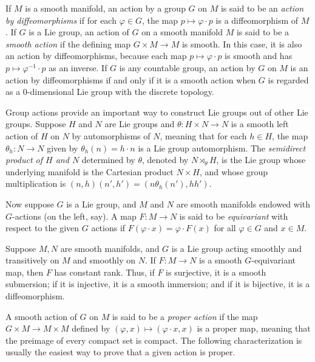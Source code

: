If $M$ is a smooth manifold, an action by a group $G$ on $M$ is said to be an \textit{action by diffeomorphisms} if for each $\varphi \in G$, the map $p \mapsto \varphi \cdot p$ is a diffeomorphism of $M$. If $G$ is a Lie group, an action of $G$ on a smooth manifold $M$ is said to be a \textit{smooth action} if the defining map $G \times M \to M$ is smooth. In this case, it is also an action by diffeomorphisms, because each map $p \mapsto \varphi \cdot p$ is smooth and has $p \mapsto \varphi^{-1} \cdot p$ as an inverse. If $G$ is any countable group, an action by $G$ on $M$ is an action by diffeomorphisms if and only if it is a smooth action when $G$ is regarded as a $0$-dimensional Lie group with the discrete topology.

\begin{example}
\label{ex:semidirect-products}
Group actions provide an important way to construct Lie groups out of other Lie groups. Suppose $H$ and $N$ are Lie groups and $\theta : H \times N \to N$ is a smooth left action of $H$ on $N$ by automorphisms of $N$, meaning that for each $h \in H$, the map $\theta_h : N \to N$ given by $\theta_h(n) = h \cdot n$ is a Lie group automorphism. The \textit{semidirect product of $H$ and $N$} determined by $\theta$, denoted by $N \rtimes_\theta H$, is the Lie group whose underlying manifold is the Cartesian product $N \times H$, and whose group multiplication is $(n,h)(n',h') = (n\theta_h(n'),hh')$.
\end{example}

Now suppose $G$ is a Lie group, and $M$ and $N$ are smooth manifolds endowed with $G$-actions (on the left, say). A map $F : M \to N$ is said to be \textit{equivariant} with respect to the given $G$ actions if $F(\varphi \cdot x) = \varphi \cdot F(x)$ for all $\varphi \in G$ and $x \in M$.

\begin{theorem}
\label{thm:equivariant-rank-theorem}
Suppose $M, N$ are smooth manifolds, and $G$ is a Lie group acting smoothly and transitively on $M$ and smoothly on $N$. If $F : M \to N$ is a smooth $G$-equivariant map, then $F$ has constant rank. Thus, if $F$ is surjective, it is a smooth submersion; if it is injective, it is a smooth immersion; and if it is bijective, it is a diffeomorphism.
\end{theorem}

A smooth action of $G$ on $M$ is said to be a \textit{proper action} if the map $G \times M \to M \times M$ defined by $(\varphi, x) \mapsto (\varphi \cdot x, x)$ is a proper map, meaning that the preimage of every compact set is compact. The following characterization is usually the easiest way to prove that a given action is proper.

